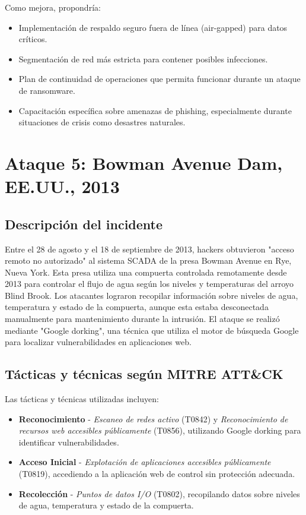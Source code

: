 Como mejora, propondría:

\begin{itemize}
    \item Implementación de respaldo seguro fuera de línea (air-gapped) para datos críticos.
    \item Segmentación de red más estricta para contener posibles infecciones.
    \item Plan de continuidad de operaciones que permita funcionar durante un ataque de ransomware.
    \item Capacitación específica sobre amenazas de phishing, especialmente durante situaciones de crisis como desastres naturales.
\end{itemize}

\section{Ataque 5: Bowman Avenue Dam, EE.UU., 2013}

\subsection{Descripción del incidente}
Entre el 28 de agosto y el 18 de septiembre de 2013, hackers obtuvieron "acceso remoto no autorizado" al sistema SCADA de la presa Bowman Avenue en Rye, Nueva York. Esta presa utiliza una compuerta controlada remotamente desde 2013 para controlar el flujo de agua según los niveles y temperaturas del arroyo Blind Brook. Los atacantes lograron recopilar información sobre niveles de agua, temperatura y estado de la compuerta, aunque esta estaba desconectada manualmente para mantenimiento durante la intrusión. El ataque se realizó mediante "Google dorking", una técnica que utiliza el motor de búsqueda Google para localizar vulnerabilidades en aplicaciones web.

\subsection{Tácticas y técnicas según MITRE ATT\&CK}
Las tácticas y técnicas utilizadas incluyen:

\begin{itemize}
    \item \textbf{Reconocimiento} - \textit{Escaneo de redes activo} (T0842) y \textit{Reconocimiento de recursos web accesibles públicamente} (T0856), utilizando Google dorking para identificar vulnerabilidades.
    
    \item \textbf{Acceso Inicial} - \textit{Explotación de aplicaciones accesibles públicamente} (T0819), accediendo a la aplicación web de control sin protección adecuada.
    
    \item \textbf{Recolección} - \textit{Puntos de datos I/O} (T0802), recopilando datos sobre niveles de agua, temperatura y estado de la compuerta.
\end{itemize}

